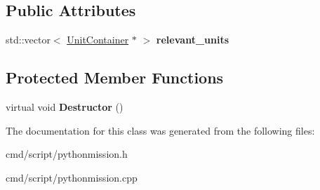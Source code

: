 \subsection*{Public Attributes}
\begin{DoxyCompactItemize}
\item 
std\+::vector$<$ \hyperlink{classUnitContainer}{Unit\+Container} $\ast$ $>$ {\bfseries relevant\+\_\+units}\hypertarget{classPythonMissionBaseClass_a44fb6cd8fa188de0b2d19deb25cb6099}{}\label{classPythonMissionBaseClass_a44fb6cd8fa188de0b2d19deb25cb6099}

\end{DoxyCompactItemize}
\subsection*{Protected Member Functions}
\begin{DoxyCompactItemize}
\item 
virtual void {\bfseries Destructor} ()\hypertarget{classPythonMissionBaseClass_aaf7543a398f6c1cf8380e6fc6cb09256}{}\label{classPythonMissionBaseClass_aaf7543a398f6c1cf8380e6fc6cb09256}

\end{DoxyCompactItemize}


The documentation for this class was generated from the following files\+:\begin{DoxyCompactItemize}
\item 
cmd/script/pythonmission.\+h\item 
cmd/script/pythonmission.\+cpp\end{DoxyCompactItemize}
